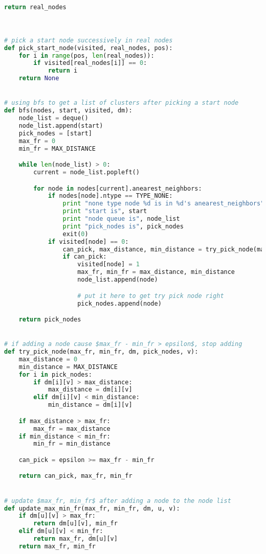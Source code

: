 \begin{lstlisting}[language={python}, caption={DSHRINK算法}, label=code:dshrink]
    return real_nodes



# pick a start node successively in real nodes
def pick_start_node(visited, real_nodes, pos):
    for i in range(pos, len(real_nodes)):
        if visited[real_nodes[i]] == 0:
            return i
    return None


# using bfs to get a list of clusters after picking a start node
def bfs(nodes, start, visited, dm):
    node_list = deque()
    node_list.append(start)
    pick_nodes = [start]
    max_fr = 0
    min_fr = MAX_DISTANCE

    while len(node_list) > 0:
        current = node_list.popleft()

        for node in nodes[current].anearest_neighbors:
            if nodes[node].ntype == TYPE_NONE:
                print "none type node %d is in %d's anearest_neighbors" % (node, current)
                print "start is", start
                print "node queue is", node_list
                print "pick_nodes is", pick_nodes
                exit(0)
            if visited[node] == 0:
                can_pick, max_distance, min_distance = try_pick_node(max_fr, min_fr, dm, pick_nodes, node)
                if can_pick:
                    visited[node] = 1
                    max_fr, min_fr = max_distance, min_distance
                    node_list.append(node)

                    # put it here to get try pick node right
                    pick_nodes.append(node)

    return pick_nodes


# if adding a node cause $max_fr - min_fr > epsilon$, stop adding
def try_pick_node(max_fr, min_fr, dm, pick_nodes, v):
    max_distance = 0
    min_distance = MAX_DISTANCE
    for i in pick_nodes:
        if dm[i][v] > max_distance:
            max_distance = dm[i][v]
        elif dm[i][v] < min_distance:
            min_distance = dm[i][v]

    if max_distance > max_fr:
        max_fr = max_distance
    if min_distance < min_fr:
        min_fr = min_distance

    can_pick = epsilon >= max_fr - min_fr

    return can_pick, max_fr, min_fr


# update $max_fr, min_fr$ after adding a node to the node list
def update_max_min_fr(max_fr, min_fr, dm, u, v):
    if dm[u][v] > max_fr:
        return dm[u][v], min_fr
    elif dm[u][v] < min_fr:
        return max_fr, dm[u][v]
    return max_fr, min_fr



\end{lstlisting}
